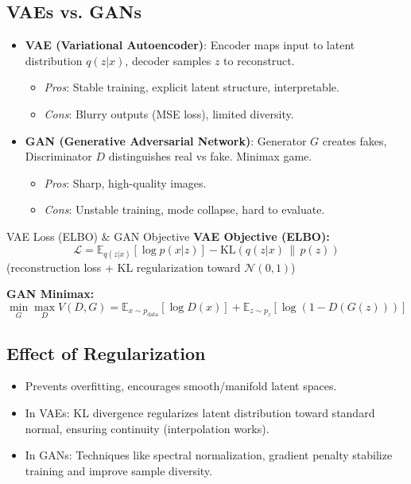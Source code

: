 \documentclass[11pt]{article}
\begin{document}
\subsection{VAEs vs. GANs}
\begin{itemize}
    \item \textbf{VAE (Variational Autoencoder)}: Encoder maps input to latent distribution $q(z|x)$, decoder samples $z$ to reconstruct.
    \begin{itemize}
        \item \textit{Pros}: Stable training, explicit latent structure, interpretable.
        \item \textit{Cons}: Blurry outputs (MSE loss), limited diversity.
    \end{itemize}
    \item \textbf{GAN (Generative Adversarial Network)}: Generator $G$ creates fakes, Discriminator $D$ distinguishes real vs fake. Minimax game.
    \begin{itemize}
        \item \textit{Pros}: Sharp, high-quality images.
        \item \textit{Cons}: Unstable training, mode collapse, hard to evaluate.
    \end{itemize}
\end{itemize}

\begin{formulabox}{VAE Loss (ELBO) \& GAN Objective}
\textbf{VAE Objective (ELBO):}
$$\mathcal{L} = \mathbb{E}_{q(z|x)}[\log p(x|z)] - \text{KL}(q(z|x) \,\|\, p(z))$$
(reconstruction loss + KL regularization toward $\mathcal{N}(0, 1)$)

\textbf{GAN Minimax:}
$$\min_G \max_D V(D, G) = \mathbb{E}_{x \sim p_{\text{data}}}[\log D(x)] + \mathbb{E}_{z \sim p_z}[\log(1 - D(G(z)))]$$
\end{formulabox}

\subsection{Effect of Regularization}
\begin{itemize}
    \item Prevents overfitting, encourages smooth/manifold latent spaces.
    \item In VAEs: KL divergence regularizes latent distribution toward standard normal, ensuring continuity (interpolation works).
    \item In GANs: Techniques like spectral normalization, gradient penalty stabilize training and improve sample diversity.
\end{itemize}
\end{document}
